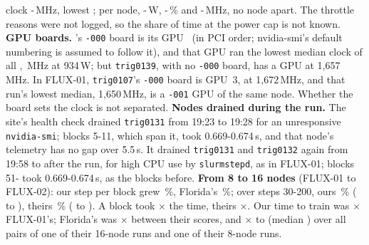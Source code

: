 clock \TriFxSixteenSmLo-\TriFxSixteenSmHi\,MHz, lowest \TriFxSixteenSmMin; per node, \TriFxSixteenNodePowerLo-\TriFxSixteenNodePowerHi\,W, \TriFxSixteenNodeHotLo-\TriFxSixteenNodeHotHi\,\% and \TriFxSixteenNodeSmLo-\TriFxSixteenNodeSmHi\,MHz, no node apart. The throttle reasons were not logged, so the share of time at the power cap is not known. \textbf{GPU boards.} \texttt{\TriFxSixteenSmLoHost}'s \texttt{-000} board is its GPU~\TriFxSixteenSmLoGpu{} (in PCI order; nvidia-smi's default numbering is assumed to follow it), and that GPU ran the lowest median clock of all \TriFxSixteenGpus, \TriFxSixteenSmLo\,MHz at 934\,W; but \texttt{trig0139}, with no \texttt{-000} board, has a GPU at 1,657\,MHz. In FLUX-01, \texttt{trig0107}'s \texttt{-000} board is GPU~3, at 1,672\,MHz, and that run's lowest median, 1,650\,MHz, is a \texttt{-001} GPU of the same node. Whether the board sets the clock is not separated. \textbf{Nodes drained during the run.} The site's health check drained \texttt{trig0131} from 19:23 to 19:28 for an unresponsive \texttt{nvidia-smi}; blocks 5-11, which span it, took 0.669-0.674\,s, and that node's telemetry has no gap over 5.5\,s. It drained \texttt{trig0131} and \texttt{trig0132} again from 19:58 to after the run, for high CPU use by \texttt{slurmstepd}, as in FLUX-01; blocks 51-\TriFxSixteenBlocks{} took 0.669-0.674\,s, as the blocks before. \textbf{From 8 to 16 nodes} (FLUX-01 to FLUX-02): our step per block grew \TriFxSixteenStepScale\,\%, Florida's \TriFxSixteenFlStepScale\,\%; over steps 30-200, ours \TriFxSixteenTenScale\,\% (\TriFxSixteenTenEightWin{} to \TriFxSixteenTen), theirs \TriFxSixteenFlTenScale\,\% (\TriFxSixteenFlTenEightWin{} to \TriFxSixteenFlTen). A block took $\times$\TriFxSixteenTpbRatio{} the time, theirs $\times$\TriFxSixteenFlTpbRatio. Our time to train was $\times$\TriFxSixteenTttRatio{} FLUX-01's; Florida's was $\times$\TriFxSixteenFlTttRatio{} between their scores, and $\times$\TriFxSixteenFlPairLo{} to \TriFxSixteenFlPairHi{} (median \TriFxSixteenFlPairMed) over all pairs of one of their 16-node runs and one of their 8-node runs.

